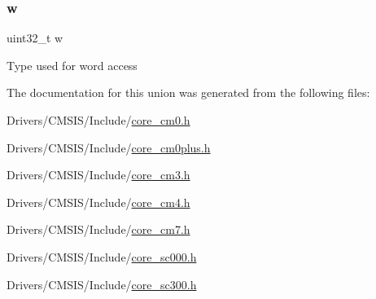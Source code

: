 \subsubsection{\texorpdfstring{w}{w}}
{\footnotesize\ttfamily uint32\+\_\+t w}

Type used for word access 

The documentation for this union was generated from the following files\+:\begin{DoxyCompactItemize}
\item 
Drivers/\+C\+M\+S\+I\+S/\+Include/\mbox{\hyperlink{core__cm0_8h}{core\+\_\+cm0.\+h}}\item 
Drivers/\+C\+M\+S\+I\+S/\+Include/\mbox{\hyperlink{core__cm0plus_8h}{core\+\_\+cm0plus.\+h}}\item 
Drivers/\+C\+M\+S\+I\+S/\+Include/\mbox{\hyperlink{core__cm3_8h}{core\+\_\+cm3.\+h}}\item 
Drivers/\+C\+M\+S\+I\+S/\+Include/\mbox{\hyperlink{core__cm4_8h}{core\+\_\+cm4.\+h}}\item 
Drivers/\+C\+M\+S\+I\+S/\+Include/\mbox{\hyperlink{core__cm7_8h}{core\+\_\+cm7.\+h}}\item 
Drivers/\+C\+M\+S\+I\+S/\+Include/\mbox{\hyperlink{core__sc000_8h}{core\+\_\+sc000.\+h}}\item 
Drivers/\+C\+M\+S\+I\+S/\+Include/\mbox{\hyperlink{core__sc300_8h}{core\+\_\+sc300.\+h}}\end{DoxyCompactItemize}
